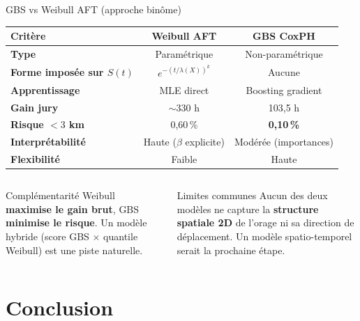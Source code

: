 \documentclass[aspectratio=169,t,11pt]{beamer}
\begin{document}
\begin{frame}{GBS vs Weibull AFT (approche binôme)}
\vspace{-2pt}
\begin{center}
\small
\begin{tabular}{>{\bfseries}lcc}
\toprule
\textbf{Critère} & \textbf{Weibull AFT} & \textbf{GBS CoxPH} \\
\midrule
Type                       & Paramétrique             & Non-paramétrique \\
Forme imposée sur $S(t)$   & $e^{-(t/\lambda(X))^k}$ & Aucune \\
Apprentissage              & MLE direct               & Boosting gradient \\
Gain jury                  & $\sim$330 h              & 103,5 h \\
Risque $<3$ km             & 0,60\,\%                 & \textbf{0,10\,\%} \\
Interprétabilité           & Haute ($\beta$ explicite)& Modérée (importances) \\
Flexibilité                & Faible                   & Haute \\
\bottomrule
\end{tabular}
\end{center}
\vspace{6pt}
\begin{columns}[T]
\begin{exampleblock}{Complémentarité}
\footnotesize
Weibull \textbf{maximise le gain brut}, GBS \textbf{minimise le risque}.
Un modèle hybride (score GBS $\times$ quantile Weibull) est une piste naturelle.
\end{exampleblock}
\begin{alertblock}{Limites communes}
\footnotesize
Aucun des deux modèles ne capture la \textbf{structure spatiale 2D}
de l'orage ni sa direction de déplacement. Un modèle spatio-temporel
serait la prochaine étape.
\end{alertblock}
\end{columns}
\end{frame}

\section{Conclusion}
\end{document}
